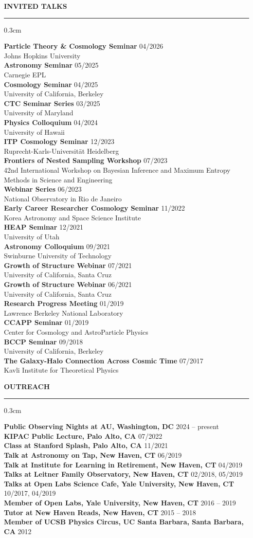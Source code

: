 \documentclass[12pt]{article}
\renewenvironment{section}[1]
  {
  \medskip
  {\color{aublue} \MakeUppercase{\bf #1}}
  \smallskip
  \hrule
  \medskip
  \begin{adjustwidth}{0.3cm}{}
  }
  {
  \end{adjustwidth}
  }
\newcommand{\entry}[3]{{\bf #1} \hfill {#2} \\ {#3}}
\begin{document}
\begin{section}{Invited Talks}
  \entry{Particle Theory \& Cosmology Seminar}{04/2026}{Johns Hopkins University} \\
  \entry{Astronomy Seminar}{05/2025}{Carnegie EPL} \\
  \entry{Cosmology Seminar}{04/2025}{University of California, Berkeley} \\
  \entry{CTC Seminar Series}{03/2025}{University of Maryland} \\
  \entry{Physics Colloquium}{04/2024}{University of Hawaii} \\
  \entry{ITP Cosmology Seminar}{12/2023}{Ruprecht-Karls-Universität Heidelberg} \\
  \entry{Frontiers of Nested Sampling Workshop}{07/2023}{42nd  International Workshop on Bayesian Inference and Maximum Entropy Methods in Science and Engineering} \\
  \entry{Webinar Series}{06/2023}{National Observatory in Rio de Janeiro} \\
  \entry{Early Career Researcher Cosmology Seminar}{11/2022}{Korea Astronomy and Space Science Institute} \\
  \entry{HEAP Seminar}{12/2021}{University of Utah} \\
  \entry{Astronomy Colloquium}{09/2021}{Swinburne University of Technology} \\
  \entry{Growth of Structure Webinar}{07/2021}{University of California, Santa Cruz} \\
  \entry{Growth of Structure Webinar}{06/2021}{University of California, Santa Cruz} \\
  \entry{Research Progress Meeting}{01/2019}{Lawrence Berkeley National Laboratory} \\
  \entry{CCAPP Seminar}{01/2019}{Center for Cosmology and AstroParticle Physics} \\
  \entry{BCCP Seminar}{09/2018}{University of California, Berkeley} \\
  \entry{The Galaxy-Halo Connection Across Cosmic Time}{07/2017}{Kavli Institute for Theoretical Physics}
\end{section}

\begin{section}{Outreach}
  \entry{Public Observing Nights at AU, Washington, DC}{2024 -- present}{}
  \entry{KIPAC Public Lecture, Palo Alto, CA}{07/2022}{}
  \entry{Class at Stanford Splash, Palo Alto, CA}{11/2021}{}
  \entry{Talk at Astronomy on Tap, New Haven, CT}{06/2019}{}
  \entry{Talk at Institute for Learning in Retirement, New Haven, CT}{04/2019}{}
  \entry{Talks at Leitner Family Observatory, New Haven, CT}{02/2018, 05/2019}{}
  \entry{Talks at Open Labs Science Cafe, Yale University, New Haven, CT}{10/2017,  04/2019}{}
  \entry{Member of Open Labs, Yale University, New Haven, CT}{2016 -- 2019}{}
  \entry{Tutor at New Haven Reads, New Haven, CT}{2015 -- 2018}{}
  \entry{Member of UCSB Physics Circus, UC Santa Barbara, Santa Barbara, CA}{2012}{}
\end{section}
\end{document}
